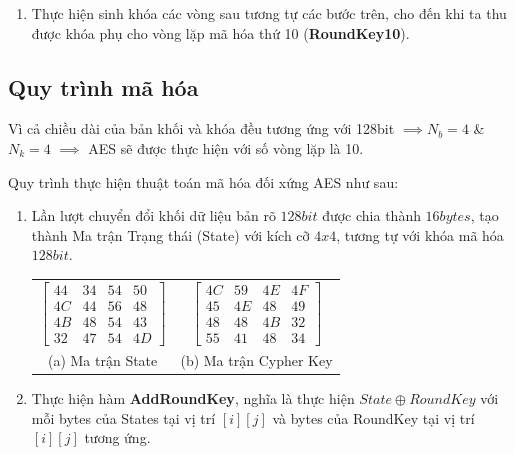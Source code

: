 \begin{enumerate}[label= \textbf{Bước \arabic*:}]
	\item Thực hiện sinh khóa các vòng sau tương tự các bước trên, cho đến khi ta thu được khóa phụ cho vòng lặp mã hóa thứ 10 (\textbf{RoundKey10}).
	
\end{enumerate}

\subsection{Quy trình mã hóa}
Vì cả chiều dài của bản khối và khóa đều tương ứng với 128bit $\implies N_b = 4$ \& $N_k = 4$
$\implies$ AES sẽ được thực hiện với số vòng lặp là 10.


Quy trình thực hiện thuật toán mã hóa đối xứng AES như sau: 

\begin{enumerate}[label= \textbf{Bước \arabic*:}]
	\item Lần lượt chuyển đổi khối dữ liệu bản rõ $128 bit$ được chia thành $16 bytes$, tạo thành Ma trận Trạng thái (State) với kích cỡ $4x4$, tương tự với khóa mã hóa $128 bit$.
	
	
	
	\begin{center}
		\begin{tabular}{cc}
			$\begin{bmatrix}
				44 & 34 & 54 & 50 \\
				4C & 44 & 56 & 48 \\
				4B & 48 & 54 & 43 \\
				32 & 47 & 54 & 4D
			\end{bmatrix}$ 
			& 
			$\begin{bmatrix}
				4C & 59 & 4E & 4F \\
				45 & 4E & 48 & 49 \\
				48 & 48 & 4B & 32 \\
				55 & 41 & 48 & 34
			\end{bmatrix}$ \\
			(a) Ma trận State & (b) Ma trận Cypher Key
		\end{tabular}
	\end{center}
	
	\item Thực hiện hàm \textbf{AddRoundKey}, nghĩa là thực hiện $State \oplus Round Key$ với mỗi bytes của States tại vị trí $[i][j]$ và bytes của RoundKey tại vị trí $[i][j]$ tương ứng. 
	

\end{enumerate}
